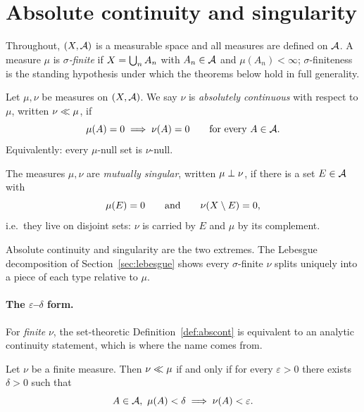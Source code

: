 \section{Absolute continuity and singularity}
\label{sec:abscont}

Throughout, $(X, \mathcal{A})$ is a measurable space and all measures are defined
on $\mathcal{A}$. A measure $\mu$ is \emph{$\sigma$-finite} if $X = \bigcup_n A_n$
with $A_n \in \mathcal{A}$ and $\mu(A_n) < \infty$; $\sigma$-finiteness is the standing
hypothesis under which the theorems below hold in full generality.

\begin{definition}
\label{def:abscont}
Let $\mu, \nu$ be measures on $(X, \mathcal{A})$. We say $\nu$ is
\emph{absolutely continuous} with respect to $\mu$, written $\nu \ll \mu$,
if
\begin{equation}
  \mu(A) = 0 \;\Longrightarrow\; \nu(A) = 0
  \qquad \text{for every } A \in \mathcal{A}.
\end{equation}
Equivalently: every $\mu$-null set is $\nu$-null.
\end{definition}

\begin{definition}
\label{def:singular}
The measures $\mu, \nu$ are \emph{mutually singular}, written $\mu \perp \nu$, if
there is a set $E \in \mathcal{A}$ with
\begin{equation}
  \mu(E) = 0 \qquad \text{and} \qquad \nu(X \setminus E) = 0,
\end{equation}
i.e.\ they live on disjoint sets: $\nu$ is carried by $E$ and $\mu$ by its
complement.
\end{definition}

Absolute continuity and singularity are the two extremes. The Lebesgue
decomposition of Section~\ref{sec:lebesgue} shows every $\sigma$-finite $\nu$
splits uniquely into a piece of each type relative to $\mu$.

\paragraph{The \texorpdfstring{$\varepsilon$--$\delta$}{epsilon-delta} form.}
For \emph{finite} $\nu$, the set-theoretic Definition~\ref{def:abscont} is
equivalent to an analytic continuity statement, which is where the name comes
from.

\begin{proposition}
\label{prop:eps-delta}
Let $\nu$ be a finite measure. Then $\nu \ll \mu$ if and only if for every
$\varepsilon > 0$ there exists $\delta > 0$ such that
\begin{equation}
  A \in \mathcal{A},\ \mu(A) < \delta \;\Longrightarrow\; \nu(A) < \varepsilon.
  \label{eq:eps-delta}
\end{equation}
\end{proposition}

